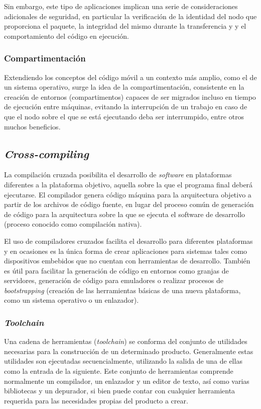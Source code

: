 Sin embargo, este tipo de aplicaciones implican una serie de consideraciones adicionales de seguridad, en particular la verificación de la identidad del nodo que proporciona el paquete, la integridad del mismo durante la transferencia y \citationneeded y el comportamiento del código en ejecución.

\subsubsection{Compartimentación}

Extendiendo los conceptos del código móvil a un contexto más amplio, como el de un sistema operativo, surge la idea de la compartimentación, consistente en la creación de entornos (compartimentos) capaces de ser migrados incluso en tiempo de ejecución entre máquinas, evitando la interrupción de un trabajo en caso de que el nodo sobre el que se está ejecutando deba ser interrumpido, entre otros muchos beneficios.

\subsection{\textit{Cross-compiling}}

La compilación cruzada posibilita el desarrollo de \textit{software} en plataformas diferentes a la plataforma objetivo, aquella sobre la que el programa final deberá ejecutarse. El compilador genera código máquina para la arquitectura objetivo a partir de los archivos de código fuente, en lugar del proceso común de generación de código para la arquitectura sobre la que se ejecuta el software de desarrollo (proceso conocido como compilación nativa).

El uso de compiladores cruzados facilita el desarrollo para diferentes plataformas y en ocasiones es la única forma de crear aplicaciones para sistemas tales como dispositivos embebidos que no cuentan con herramientas de desarrollo. También es útil para facilitar la generación de código en entornos como granjas de servidores, generación de código para emuladores o realizar procesos de \textit{bootstrapping} (creación de las herramientas básicas de una nueva plataforma, como un sistema operativo o un enlazador).


\subsubsection{\textit{Toolchain}}

Una cadena de herramientas (\textit{toolchain}) se conforma del conjunto de utilidades necesarias para la construcción de un determinado producto. Generalmente estas utilidades son ejecutadas secuencialmente, utilizando la salida de una de ellas como la entrada de la siguiente. Este conjunto de herramientas comprende normalmente un compilador, un enlazador y un editor de texto, así como varias bibliotecas y un depurador, si bien puede contar con cualquier herramienta requerida para las necesidades propias del producto a crear.

